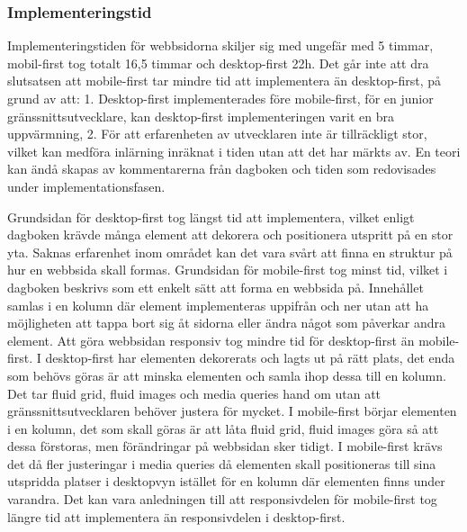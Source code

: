 \documentclass[11pt]{article}
\begin{document}
\subsubsection{Implementeringstid}
Implementeringstiden för webbsidorna skiljer sig med ungefär med 5 timmar, mobil-first tog totalt 16,5 timmar och desktop-first 22h. Det går inte att dra slutsatsen att mobile-first tar mindre tid att implementera än desktop-first, på grund av att: 1. Desktop-first implementerades före mobile-first, för en junior gränssnittsutvecklare, kan desktop-first implementeringen varit en bra uppvärmning, 2. För att erfarenheten av utvecklaren inte är tillräckligt stor, vilket kan medföra inlärning inräknat i tiden utan att det har märkts av. En teori kan ändå skapas av kommentarerna från dagboken och tiden som redovisades under implementationsfasen.

Grundsidan för desktop-first tog längst tid att implementera, vilket enligt dagboken krävde många element att dekorera och positionera utspritt på en stor yta. Saknas erfarenhet inom området kan det vara svårt att finna en struktur på hur en webbsida skall formas. Grundsidan för mobile-first tog minst tid, vilket i dagboken beskrivs som ett enkelt sätt att forma en webbsida på. Innehållet samlas i en kolumn där element implementeras uppifrån och ner utan att ha möjligheten att tappa bort sig åt sidorna eller ändra något som påverkar andra element. Att göra webbsidan responsiv tog mindre tid för desktop-first än mobile-first. I desktop-first har elementen dekorerats och lagts ut på rätt plats, det enda som behövs göras är att minska elementen och samla ihop dessa till en kolumn. Det tar fluid grid, fluid images och media queries hand om utan att gränssnittsutvecklaren behöver justera för mycket. I mobile-first börjar elementen i en kolumn, det som skall göras är att låta fluid grid, fluid images göra så att dessa förstoras, men förändringar på webbsidan sker tidigt. I mobile-first krävs det då fler justeringar i media queries då elementen skall positioneras till sina utspridda platser i desktopvyn istället för en kolumn där elementen finns under varandra. Det kan vara anledningen till att responsivdelen för mobile-first tog längre tid att implementera än responsivdelen i desktop-first.
\end{document}
